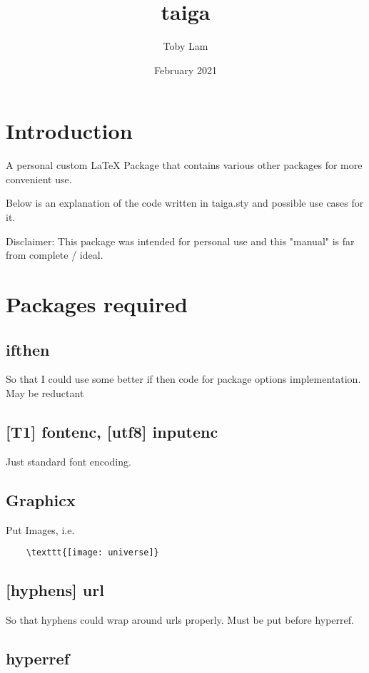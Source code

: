 \documentclass{article}
\title{taiga}
\author{Toby Lam}
\date{February 2021}
\begin{document}
\maketitle

\section{Introduction}

A personal custom LaTeX Package that contains various other packages for more convenient use.

Below is an explanation of the code written in taiga.sty and possible use cases for it.

Disclaimer: This package was intended for personal use and this "manual" is far from complete / ideal.

\section{Packages required}

\subsection{ifthen}

So that I could use some better if then code for package options implementation. May be reductant

\subsection{[T1] fontenc, [utf8] inputenc}

Just standard font encoding.

\subsection{Graphicx}

Put Images, i.e.

\begin{verbatim}
	\texttt{[image: universe]}
\end{verbatim} 

\subsection{[hyphens] url}

So that hyphens could wrap around urls properly. Must be put before hyperref.

\subsection{hyperref}
\end{document}
